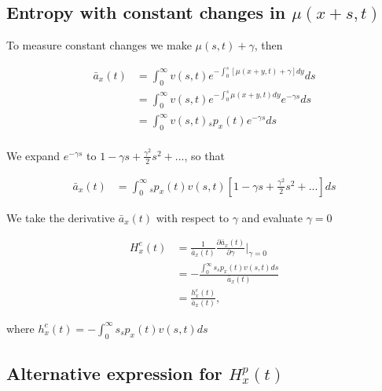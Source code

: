 \documentclass[12pt]{article}
\begin{document}
\subsection{Entropy with constant changes in $\mu(x+s,t)$}\label{sec:EntropyConst}

To measure constant changes we make $\mu(s,t)+\gamma$, then

\begin{equation}\label{eq:EntropyConst1}
\begin{split}
\bar{a}_{x}(t) &= \int_0^\infty{v}(s,t) e^{-\int_{0}^{s} [\mu(x+y,t)+\gamma]dy}ds \\
&= \int_0^\infty {v}(s,t)e^{-\int_{0}^{s} \mu(x+y,t)dy} e^{-\gamma s}ds \\
&= \int_0^\infty {v}(s,t){}_sp_x(t) e^{-\gamma s}ds \\
\end{split}
\end{equation}

We expand $e^{-\gamma s}$ to $1-\gamma s+\frac{\gamma^2}{2} s^{2} +...$, so that


\begin{equation}\label{eq:EntropyConst2}
\begin{split}
\bar{a}_{x}(t) &= \int_0^\infty {}_sp_x(t) {v}(s,t)[1-\gamma s+\frac{\gamma^2}{2} s^{2} +...]ds
\end{split}
\end{equation}

We take the derivative $\bar{a}_{x}(t)$ with respect to $\gamma$ and evaluate $\gamma=0$


\begin{equation}\label{eq:EntropyConst3}
\begin{split}
{H}^{c}_x(t)&=\frac{1}{\bar{a}_x(t)}\frac{\partial \bar{a}_x(t)}{\partial \gamma} \bigg\rvert_{\gamma=0}\\
&= -\frac{\int_0^\infty s {}_sp_x(t) {v}(s,t)ds}{\bar{a}_x(t)} \\
&= \frac{{h}^{c}_x(t)}{\bar{a}_x(t)},
\end{split}
\end{equation}

where ${h}^{c}_x(t)=-\int_0^\infty s {}_sp_x(t) {v}(s,t)ds$



\subsection{Alternative expression for ${H}^{p}_{x}(t)$}\label{sec:EntropyAlt}
\end{document}
